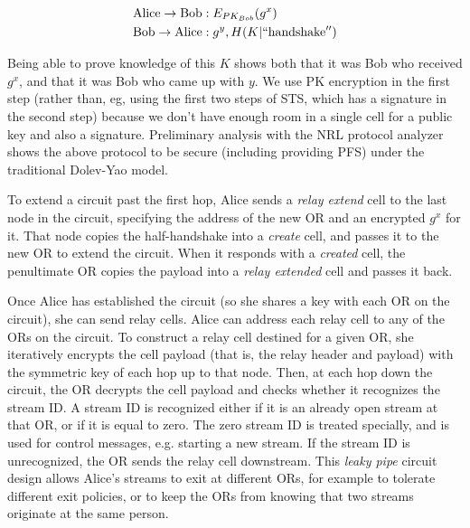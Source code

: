 \documentclass[times,10pt,twocolumn]{article}
\begin{document}
\begin{equation}
\begin{aligned}
\mathrm{Alice} \rightarrow \mathrm{Bob}&: E_{PK_{Bob}}(g^x) \\
\mathrm{Bob} \rightarrow \mathrm{Alice}&: g^y, H(K | \mathrm{``handshake''}) \\
\end{aligned}
\end{equation}

Being able to prove knowledge of this $K$ shows both that it was Bob
who received $g^x$, and that it was Bob who came up with $y$. We use
PK encryption in the first step (rather than, eg, using the first two
steps of STS, which has a signature in the second step) because we
don't have enough room in a single cell for a public key and also a
signature. Preliminary analysis with the NRL protocol analyzer shows
the above protocol to be secure (including providing PFS) under the
traditional Dolev-Yao model.

To extend a circuit past the first hop, Alice sends a \emph{relay extend}
cell to the last node in the circuit, specifying the address of the new
OR and an encrypted $g^x$ for it. That node copies the half-handshake
into a \emph{create} cell, and passes it to the new OR to extend the
circuit. When it responds with a \emph{created} cell, the penultimate OR
copies the payload into a \emph{relay extended} cell and passes it back.

Once Alice has established the circuit (so she shares a key with each
OR on the circuit), she can send relay cells.
Alice can address each relay cell to any of the ORs on the circuit. To
construct a relay cell destined for a given OR, she iteratively
encrypts the cell payload (that is, the relay header and payload)
with the symmetric key of each hop up to that node. Then, at each hop
down the circuit, the OR decrypts the cell payload and checks whether
it recognizes the stream ID. A stream ID is recognized either if it
is an already open stream at that OR, or if it is equal to zero. The
zero stream ID is treated specially, and is used for control messages,
e.g.  starting a new stream. If the stream ID is unrecognized, the OR
sends the relay cell downstream. This \emph{leaky pipe} circuit design
allows Alice's streams to exit at different ORs, for example to tolerate
different exit policies, or to keep the ORs from knowing that two streams
originate at the same person.
\end{document}
